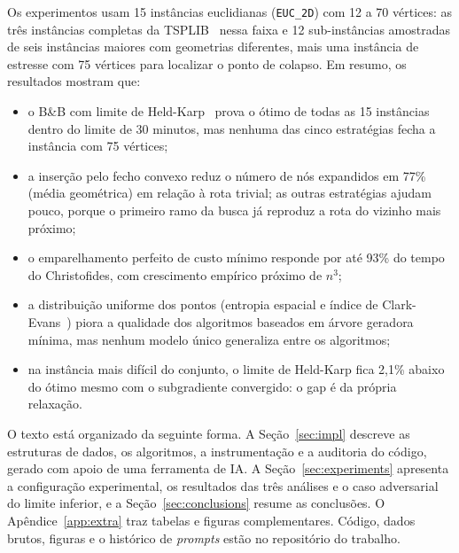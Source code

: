 Os experimentos usam 15 instâncias euclidianas (\texttt{EUC\_2D}) com 12 a 70 vértices:
as três instâncias completas da TSPLIB~\cite{reinelt1991} nessa faixa e 12
sub-instâncias amostradas de seis instâncias maiores com geometrias diferentes, mais uma
instância de estresse com 75 vértices para localizar o ponto de colapso. Em resumo, os
resultados mostram que:
\begin{itemize}
  \item o B\&B com limite de Held-Karp~\cite{held1970,held1971} prova o ótimo de todas
    as 15 instâncias dentro do limite de 30 minutos, mas nenhuma das cinco estratégias
    fecha a instância com 75 vértices;
  \item a inserção pelo fecho convexo reduz o número de nós expandidos em 77\% (média
    geométrica) em relação à rota trivial; as outras estratégias ajudam pouco, porque o
    primeiro ramo da busca já reproduz a rota do vizinho mais próximo;
  \item o emparelhamento perfeito de custo mínimo responde por até 93\% do tempo do
    Christofides, com crescimento empírico próximo de $n^3$;
  \item a distribuição uniforme dos pontos (entropia espacial e índice de
    Clark-Evans~\cite{clark1954}) piora a qualidade dos algoritmos baseados em árvore
    geradora mínima, mas nenhum modelo único generaliza entre os algoritmos;
  \item na instância mais difícil do conjunto, o limite de Held-Karp fica 2,1\% abaixo do
    ótimo mesmo com o subgradiente convergido: o gap é da própria relaxação.
\end{itemize}

O texto está organizado da seguinte forma. A Seção~\ref{sec:impl} descreve as
estruturas de dados, os algoritmos, a instrumentação e a auditoria do código, gerado com
apoio de uma ferramenta de IA. A Seção~\ref{sec:experiments} apresenta a configuração
experimental, os resultados das três análises e o caso adversarial do limite inferior, e
a Seção~\ref{sec:conclusions} resume as conclusões. O Apêndice~\ref{app:extra} traz
tabelas e figuras complementares. Código, dados brutos, figuras e o histórico de \emph{prompts} estão no
repositório do trabalho.
